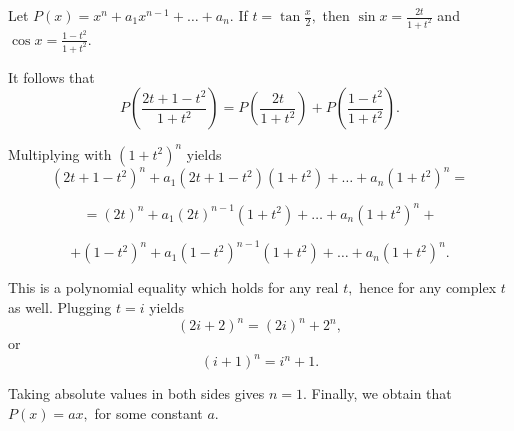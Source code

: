 \begin{solution}
	Let $P\left(  x\right)  =x^{n}+a_{1}x^{n-1}+\ldots+a_{n}.$ If $t=\tan\frac
{x}{2},$ then $\sin x=\frac{2t}{1+t^{2}}$ and $\cos x=\frac{1-t^{2}}{1+t^{2}
}.$

It follows that
\[
P\left(  \frac{2t+1-t^{2}}{1+t^{2}}\right)  =P\left(  \frac{2t}{1+t^{2}
}\right)  +P\left(  \frac{1-t^{2}}{1+t^{2}}\right)  .
\]


Multiplying with $\left(  1+t^{2}\right)  ^{n}$ yields
\[
\left(  2t+1-t^{2}\right)  ^{n}+a_{1}\left(  2t+1-t^{2}\right)  \left(
1+t^{2}\right)  +\ldots+a_{n}\left(  1+t^{2}\right)  ^{n}=
\]


\[
=\left(  2t\right)  ^{n}+a_{1}\left(  2t\right)  ^{n-1}\left(  1+t^{2}\right)
+\ldots+a_{n}\left(  1+t^{2}\right)  ^{n}+
\]


\[
+\left(  1-t^{2}\right)  ^{n}+a_{1}\left(  1-t^{2}\right)  ^{n-1}\left(
1+t^{2}\right)  +\ldots+a_{n}\left(  1+t^{2}\right)  ^{n}.
\]


This is a polynomial equality which holds for any real $t,$ hence for any complex $t$ as well. Plugging $t=i$ yields
\[
\left(  2i+2\right)  ^{n}=\left(  2i\right)  ^{n}+2^{n},
\]
or
\[
\left(  i+1\right)  ^{n}=i^{n}+1.
\]


Taking absolute values in both sides gives $n=1.$ Finally, we obtain that
$P\left(  x\right)  =ax,$ for some constant $a.$
\end{solution}



